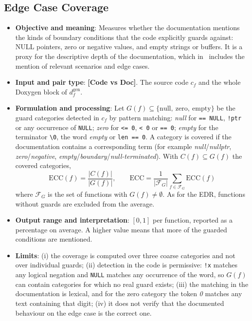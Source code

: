 \subsection{Edge Case Coverage}
\label{sec:m-ecc}
\begin{itemize}[leftmargin=*, label=\textbullet]
	\item \textbf{Objective and meaning}: Measures whether the documentation mentions the kinds of
	boundary conditions that the code explicitly guards against: NULL pointers, zero or negative
	values, and empty strings or buffers. It is a proxy for the descriptive depth of the
	documentation, which in~\cite{yang_docagent_2025} includes the mention of relevant scenarios and
	edge cases.

	\item \textbf{Input and pair type}: \textbf{[Code vs Doc]}. The source code $c_f$ and the whole
	Doxygen block of $d_f^{\mathrm{gen}}$.

	\item \textbf{Formulation and processing}: Let $G(f)\subseteq\{\mathrm{null},\ \mathrm{zero},\
	\mathrm{empty}\}$ be the guard categories detected in $c_f$ by pattern matching:
	\emph{null} for \texttt{== NULL}, \texttt{!ptr} or any occurrence of \texttt{NULL};
	\emph{zero} for \texttt{<= 0}, \texttt{< 0} or \texttt{== 0}; \emph{empty} for the terminator
	\texttt{\textbackslash 0}, the word \emph{empty} or \texttt{len == 0}. A category is covered if
	the documentation contains a corresponding term (for example \emph{null}/\emph{nullptr},
	\emph{zero}/\emph{negative}, \emph{empty}/\emph{boundary}/\emph{null-terminated}). With
	$C(f)\subseteq G(f)$ the covered categories,
	\begin{equation}
		\mathrm{ECC}(f) = \frac{|C(f)|}{|G(f)|}, \qquad
		\mathrm{ECC} = \frac{1}{|\mathcal{F}_{G}|}\sum_{f\in\mathcal{F}_{G}} \mathrm{ECC}(f)
		\label{eq:ecc}
	\end{equation}
	where $\mathcal{F}_{G}$ is the set of functions with $G(f)\neq\emptyset$. As for the EDR, functions
	without guards are excluded from the average.

	\item \textbf{Output range and interpretation}: $[0,1]$ per function, reported as a percentage
	on average. A higher value means that more of the guarded conditions are mentioned.

	\item \textbf{Limits}: (i) the coverage is computed over three coarse categories and not over
	individual guards; (ii) detection in the code is permissive: \texttt{!x} matches any logical
	negation and \texttt{NULL} matches any occurrence of the word, so $G(f)$ can contain categories
	for which no real guard exists; (iii) the matching in the documentation is lexical, and for the
	zero category the token \emph{0} matches any text containing that digit; (iv) it does not verify
	that the documented behaviour on the edge case is the correct one.
\end{itemize}

